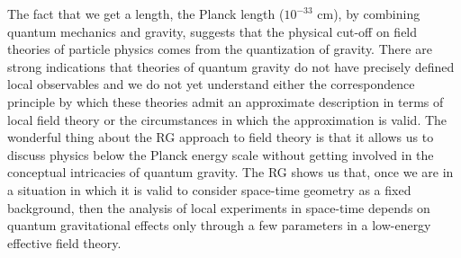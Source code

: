 The fact that we get a length, the Planck length ($10^{-33}$ cm), by combining
quantum mechanics and gravity, suggests that the physical cut-off on field
theories of particle physics comes from the quantization of gravity. There are
strong indications that theories of quantum gravity do not have precisely
defined local observables and we do not yet understand either the
correspondence principle by which these theories admit an approximate
description in terms of local field theory or the circumstances in which the
approximation is valid. The wonderful thing about the RG approach to field
theory is that it allows us to discuss physics below the Planck energy scale
without getting involved in the conceptual intricacies of quantum gravity.
The RG shows us that, once we are in a situation in which it is valid to
consider space-time geometry as a fixed background, then the analysis of local
experiments in space-time depends on quantum gravitational effects only
through a few parameters in a low-energy effective field theory.

